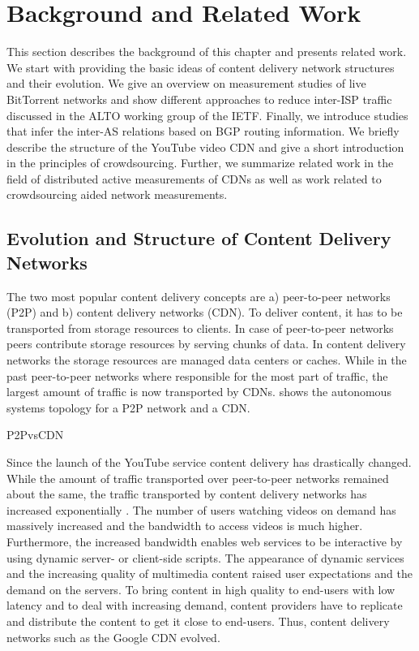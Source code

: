 \section{Background and Related Work}\label{sec:aslevel:background}

This section describes the background of this chapter and presents related work.
We start with providing the basic ideas of content delivery network structures and their evolution.
We give an overview on measurement studies of live BitTorrent networks and show different approaches to reduce inter-ISP traffic discussed in the ALTO working group of the IETF. Finally, we introduce studies that infer the inter-AS relations based on BGP routing information.
We briefly describe the structure of the YouTube video CDN and give a short introduction in the principles of crowdsourcing.
Further, we summarize related work in the field of distributed active measurements of CDNs as well as work related to crowdsourcing aided network measurements.

\subsection{Evolution and Structure of Content Delivery Networks}

The two most popular content delivery concepts are a) peer-to-peer networks (P2P) and b) content delivery networks (CDN).
To deliver content, it has to be transported from storage resources to clients.
In case of peer-to-peer networks peers contribute storage resources by serving chunks of data.
In content delivery networks the storage resources are managed data centers or caches.
While in the past peer-to-peer networks where responsible for the most part of traffic, the largest amount of traffic is now transported by CDNs.
 shows the autonomous systems topology for a P2P network and a CDN.

\begin{table}
	\caption{P2PvsCDN}
\end{table}

Since the launch of the YouTube service content delivery has drastically changed.
While the amount of traffic transported over peer-to-peer networks remained about the same, the traffic transported by content delivery networks has increased exponentially \cite{cisco2016}.
The number of users watching videos on demand has massively increased and the bandwidth to access videos is much higher.
Furthermore, the increased bandwidth enables web services to be interactive by using dynamic server- or client-side scripts.
The appearance of dynamic services and the increasing quality of multimedia content raised user expectations and the demand on the servers.
To bring content in high quality to end-users with low latency and to deal with increasing demand, content providers have to replicate and distribute the content to get it close to end-users.
Thus, content delivery networks such as the Google CDN evolved.

